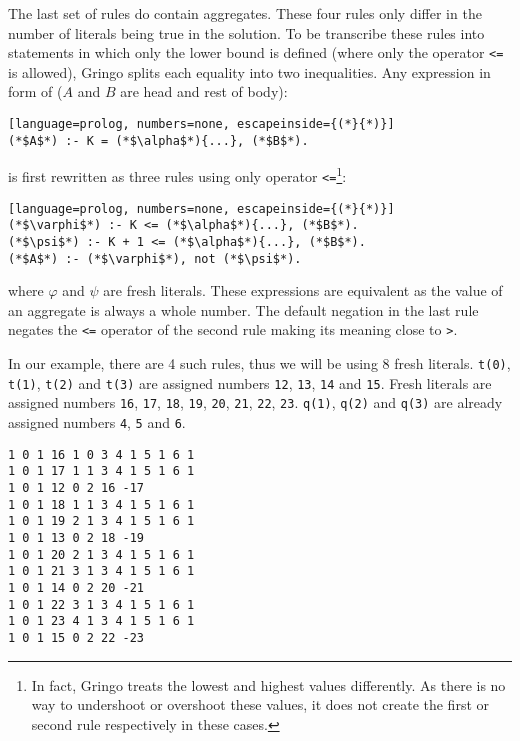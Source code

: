\begin{example}
    The last set of rules do contain aggregates. These four rules only differ
    in the number of literals being true in the solution.
    To be transcribe these rules into statements in which only the lower bound
    is defined (where only the operator \texttt{<=} is allowed),
    Gringo splits each equality into two inequalities. Any expression
    in form of ($A$ and $B$ are head and rest of body):
    \begin{lstlisting}[language=prolog, numbers=none, escapeinside={(*}{*)}]
(*$A$*) :- K = (*$\alpha$*){...}, (*$B$*).
\end{lstlisting}
    is first rewritten as three rules using only operator \texttt{<=}\footnote{
        In fact, Gringo treats the lowest and highest values differently.
        As there is no way to undershoot or overshoot these values,
        it does not create the first or second rule respectively in these cases.
    }:
    \begin{lstlisting}[language=prolog, numbers=none, escapeinside={(*}{*)}]
(*$\varphi$*) :- K <= (*$\alpha$*){...}, (*$B$*).
(*$\psi$*) :- K + 1 <= (*$\alpha$*){...}, (*$B$*).
(*$A$*) :- (*$\varphi$*), not (*$\psi$*).
\end{lstlisting}
    where $\varphi$ and $\psi$ are fresh literals.
    These expressions are equivalent as the value of an aggregate is always
    a whole number. The default negation in the last rule negates the \texttt{<=}
    operator of the second rule making its meaning close to \texttt{>}.

    In our example, there are 4 such rules, thus we will be using 8 fresh literals.
    \texttt{t(0)}, \texttt{t(1)}, \texttt{t(2)} and \texttt{t(3)} are
    assigned numbers \texttt{12}, \texttt{13}, \texttt{14} and \texttt{15}.
    Fresh literals are assigned numbers 
    \texttt{16}, \texttt{17}, \texttt{18}, \texttt{19},
    \texttt{20}, \texttt{21}, \texttt{22}, \texttt{23}.
    \texttt{q(1)}, \texttt{q(2)} and \texttt{q(3)} are already assigned numbers
    \texttt{4}, \texttt{5} and \texttt{6}.
    \begin{lstlisting}[firstnumber=14]
1 0 1 16 1 0 3 4 1 5 1 6 1
1 0 1 17 1 1 3 4 1 5 1 6 1
1 0 1 12 0 2 16 -17
1 0 1 18 1 1 3 4 1 5 1 6 1
1 0 1 19 2 1 3 4 1 5 1 6 1
1 0 1 13 0 2 18 -19
1 0 1 20 2 1 3 4 1 5 1 6 1
1 0 1 21 3 1 3 4 1 5 1 6 1
1 0 1 14 0 2 20 -21
1 0 1 22 3 1 3 4 1 5 1 6 1
1 0 1 23 4 1 3 4 1 5 1 6 1
1 0 1 15 0 2 22 -23
\end{lstlisting}


\end{example}
